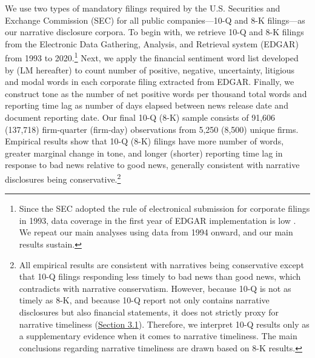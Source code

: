 \documentclass[a4paper]{article}
\begin{document}
\begin{spacing}{2}
We use two types of mandatory filings required by the U.S. Securities and Exchange Commission (SEC) for all public companies---10-Q and 8-K filings---as our narrative disclosure corpora. To begin with, we retrieve 10-Q and 8-K filings from the Electronic Data Gathering, Analysis, and Retrieval system (EDGAR) from 1993 to 2020.\footnote{Since the SEC adopted the rule of electronical submission for corporate filings in 1993, data coverage in the first year of EDGAR implementation is low . We repeat our main analyses using data from 1994 onward, and our main results sustain.} Next, we apply the financial sentiment word list developed by  (LM hereafter) to count number of positive, negative, uncertainty, litigious and modal words in each corporate filing extracted from EDGAR. Finally, we construct tone as the number of net positive words per thousand total words and reporting time lag as number of days elapsed between news release date and document reporting date. Our final 10-Q (8-K) sample consists of 91,606 (137,718) firm-quarter (firm-day) observations from 5,250 (8,500) unique firms. Empirical results show that 10-Q (8-K) filings have more number of words, greater marginal change in tone, and longer (shorter) reporting time lag in response to bad news relative to good news, generally consistent with narrative disclosures being conservative.\footnote{All empirical results are consistent with narratives being conservative except that 10-Q filings responding less timely to bad news than good news, which contradicts with narrative conservatism. However, because 10-Q is not as timely as 8-K, and because 10-Q report not only contains narrative disclosures but also financial statements, it does not strictly proxy for narrative timeliness (\hyperref[sec3.1]{Section 3.1}). Therefore, we interpret 10-Q results only as a supplementary evidence when it comes to narrative timeliness. The main conclusions regarding narrative timeliness are drawn based on 8-K results.}



\end{spacing}
\end{document}
